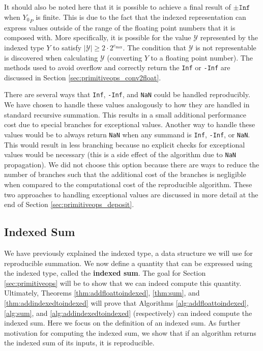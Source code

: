       It should also be noted here that it is possible to achieve a final result of
      $\pm \texttt{Inf}$ when ${Y_0}_P$ is finite. This is due to
      the fact that the indexed representation can express values outside of
      the range of the floating point numbers that it is composed with. More
      specifically, it is possible for the value $\mathcal{Y}$ represented by
      the indexed type $Y$ to satisfy $|\mathcal{Y}| \geq 2 \cdot
      2^{e_{\max}}$. The condition that $\mathcal{Y}$ is not representable is
      discovered when calculating $\mathcal{Y}$ (converting $Y$ to a floating
      point number). The methods used to avoid overflow and correctly return
      the \texttt{Inf} or \texttt{-Inf} are discussed in Section
      \ref{sec:primitiveops_conv2float}.

      There are several ways that \texttt{Inf}, \texttt{-Inf}, and \texttt{NaN} could be handled reproducibly. We have chosen to handle these values analogously to how they are handled in standard recursive summation. This results in a small additional performance cost due to special branches for exceptional values. Another way to handle these values would be to always return \texttt{NaN} when any summand is \texttt{Inf}, \texttt{-Inf}, or \texttt{NaN}. This would result in less branching because no explicit checks for exceptional values would be necessary (this is a side effect of the algorithm due to \texttt{NaN} propagation). We did not choose this option because there are ways to reduce the number of branches such that the additional cost of the branches is negligible when compared to the computational cost of the reproducible algorithm. These two approaches to handling exceptional values are discussed in more detail at the end of Section \ref{sec:primitiveops_deposit}.

    \subsection{Indexed Sum}
      \label{sec:indexed_sum}
      We have previously explained the indexed type, a data structure we will use for reproducible summation. We now define a quantity that can be expressed using the indexed type, called the \textbf{indexed sum}. The goal for Section \ref{sec:primitiveops} will be to show that we can indeed compute this quantity. Ultimately, Theorems \ref{thm:addfloattoindexed}, \ref{thm:sum}, and \ref{thm:addindexedtoindexed} will prove that Algorithms \ref{alg:addfloattoindexed}, \ref{alg:sum}, and \ref{alg:addindexedtoindexed} (respectively) can indeed compute the indexed sum. Here we focus on the definition of an indexed sum. As further motivation for computing the indexed sum, we show that if an algorithm returns the indexed sum of its inputs, it is reproducible.

